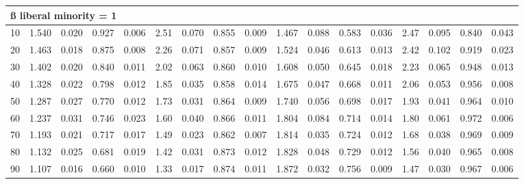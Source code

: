 \documentclass[
]{article}
\begin{document}
\begin{table}[H]
\begin{table}
{\begin{tabular}{r|r|r|r|r|r|r|r|r|r|r|r|r|r|r|r|r}
\hline
\multicolumn{17}{l}{\textbf{ß liberal minority = 1}}\\
\hline
\hspace{1em}10 & 1.540 & 0.020 & 0.927 & 0.006 & 2.51 & 0.070 & 0.855 & 0.009 & 1.467 & 0.088 & 0.583 & 0.036 & 2.47 & 0.095 & 0.840 & 0.043\\
\hline
\hspace{1em}20 & 1.463 & 0.018 & 0.875 & 0.008 & 2.26 & 0.071 & 0.857 & 0.009 & 1.524 & 0.046 & 0.613 & 0.013 & 2.42 & 0.102 & 0.919 & 0.023\\
\hline
\hspace{1em}30 & 1.402 & 0.020 & 0.840 & 0.011 & 2.02 & 0.063 & 0.860 & 0.010 & 1.608 & 0.050 & 0.645 & 0.018 & 2.23 & 0.065 & 0.948 & 0.013\\
\hline
\hspace{1em}40 & 1.328 & 0.022 & 0.798 & 0.012 & 1.85 & 0.035 & 0.858 & 0.014 & 1.675 & 0.047 & 0.668 & 0.011 & 2.06 & 0.053 & 0.956 & 0.008\\
\hline
\hspace{1em}50 & 1.287 & 0.027 & 0.770 & 0.012 & 1.73 & 0.031 & 0.864 & 0.009 & 1.740 & 0.056 & 0.698 & 0.017 & 1.93 & 0.041 & 0.964 & 0.010\\
\hline
\hspace{1em}60 & 1.237 & 0.031 & 0.746 & 0.023 & 1.60 & 0.040 & 0.866 & 0.011 & 1.804 & 0.084 & 0.714 & 0.014 & 1.80 & 0.061 & 0.972 & 0.006\\
\hline
\hspace{1em}70 & 1.193 & 0.021 & 0.717 & 0.017 & 1.49 & 0.023 & 0.862 & 0.007 & 1.814 & 0.035 & 0.724 & 0.012 & 1.68 & 0.038 & 0.969 & 0.009\\
\hline
\hspace{1em}80 & 1.132 & 0.025 & 0.681 & 0.019 & 1.42 & 0.031 & 0.873 & 0.012 & 1.828 & 0.048 & 0.729 & 0.012 & 1.56 & 0.040 & 0.965 & 0.008\\
\hline
\hspace{1em}90 & 1.107 & 0.016 & 0.660 & 0.010 & 1.33 & 0.017 & 0.874 & 0.011 & 1.872 & 0.032 & 0.756 & 0.009 & 1.47 & 0.030 & 0.967 & 0.006\\
\hline
\end{tabular}}
\end{table}
\end{table}
\end{document}

